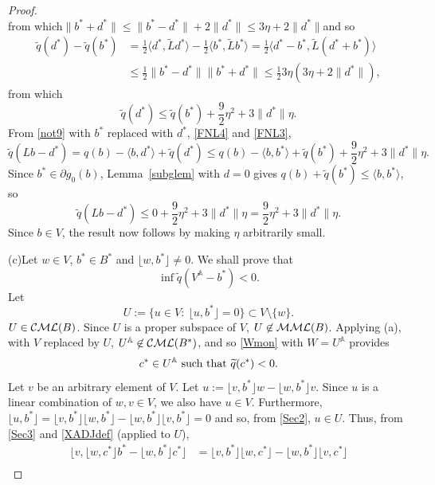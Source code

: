 \documentclass[letterpaper]{article}
\theoremstyle{plain}
\theoremstyle{definition}
\numberwithin{equation}{section}
\newcommand{\A}{{\mathbb A}}
\newcommand{\bra}[2]{\langle#1,#2\rangle}
\newcommand{\Bra}[2]{\big\langle#1,#2\big\rangle}
\newcommand{\CML}{{\cal CML}}
\newcommand{\half}{{\textstyle\frac{1}{2}}}
\newcommand{\Lt}{{\wt L}}
\newcommand{\MML}{{\cal MML}}
\newcommand{\qt}{\wt q}
\newcommand{\st}{\hbox{such that}}
\newcommand{\ts}{\textstyle}
\newcommand{\wt}{\widetilde}
\newcommand{\xbra}[2]{\lfloor#1,#2\rfloor}
\newcommand{\Xbra}[2]{\big\lfloor#1,#2\big\rfloor}
\newcommand{\Lem}{Lemma~\ref}
\begin{document}
\begin{proof}
\begin{equation}
\end{equation}
%
from which\quad $\|b^* + d^*\| \le \|b^* - d^*\| + 2\|d^*\| \le 3\eta + 2\|d^*\|$\quad and so
\begin{align*}
\qt(d^*) - \qt(b^*) &= \half\Bra{d^*}{\Lt d^*} - \half\Bra{b^*}{\Lt b^*} = \half\Bra{d^* - b^*}{\Lt(d^* + b^*)}\\
&\le \half\|b^* - d^*\|\|b^* + d^*\| \le \half 3\eta(3\eta + 2\|d^*\|),
\end{align*}
%
from which
%
\begin{equation}\label{FNL3}
\qt(d^*) \le \qt(b^*) + \textstyle\frac{9}{2}\eta^2 + 3\|d^*\|\eta.
\end{equation}
%
From \eqref{not9} with $b^*$ replaced with $d^*$, \eqref{FNL4} and \eqref{FNL3}, 
%    
$$\qt(Lb - d^*) = q(b) - \bra{b}{d^*} + \qt(d^*) \le q(b) - \bra{b}{b^*} + \qt(b^*) + \ts\frac{9}{2}\eta^2 + 3\|d^*\|\eta.$$
%
Since $b^* \in \partial g_0(b)$, \Lem{subglem} with $d = 0$ gives $q(b) + \qt(b^*) \le \bra{b}{b^*}$, so 
%    
$$\qt(Lb - d^*) \le 0 + \ts\frac{9}{2}\eta^2 + 3\|d^*\|\eta = \ts\frac{9}{2}\eta^2+ 3\|d^*\|\eta.$$
%
Since $b \in V$, the result now follows by making $\eta$ arbitrarily small.
\par
(c)\enspace Let $w \in V$, $b^* \in B^*$ and $\xbra{w}{b^*} \ne 0$. We shall prove that
\begin{equation}\label{Sec1}
\inf\qt(V^\A - b^*) < 0.
\end{equation}
%
Let 
\begin{equation}\label{Sec2}
{U}:= \big\{u \in V\colon\ \xbra{u}{b^*} = 0\big\} \subset V \setminus \{w\}.
\end{equation}
%
${U} \in \CML(B)$.  Since $U$ is a proper subspace of $V$, $U \not\in \MML(B)$.   Applying (a), with $V$ replaced by $U$, $U^\A \not\in \CML(B^*)$, and so \eqref{Wmon} with $W = U^\A$ provides
\begin{equation}\label{Sec3}
c^* \in {U}^\A\ \st\ \qt(c^*) < 0.
\end{equation}
%
Let $v$ be an arbitrary element of $V$.   Let $u := \xbra{v}{b^*}w - \xbra{w}{b^*}v$. Since $u$ is a linear combination of $w,v \in V$, we also have $u \in V$.   Furthermore, $\xbra{u}{b^*} = \xbra{v}{b^*}\xbra{w}{b^*} - \xbra{w}{b^*}\xbra{v}{b^*} = 0$ and so, from \eqref{Sec2}, $u \in U$.   Thus, from
\eqref{Sec3} and \eqref{XADJdef} (applied to $U$),
%
\begin{align*}
\Xbra{v}{\xbra{w}{c^*}b^* - \xbra{w}{b^*}c^*} &= \xbra{v}{b^*} \xbra{w}{c^*} - \xbra{w}{b^*}\xbra{v}{c^*}\\

\end{align*}
\end{proof}
\end{document}
